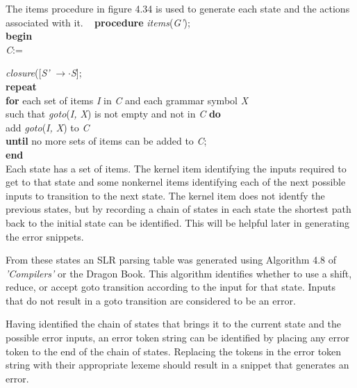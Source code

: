 \documentclass{article}
\begin{document}
The items procedure in figure 4.34 is used to generate each state and the actions associated with it. ~\cite{aho}
\hspace*{1in}\textbf{procedure} \textit{items}(\textit{G'});\\
\hspace*{1in}\textbf{begin}\\
\hspace*{1.25in}\textit{C}:={\textit{closure}({[\textit{S'} $\rightarrow \cdot$\textit{S}]};\\
\hspace*{1.25in}\textbf{repeat}\\
\hspace*{1.5in}\textbf{for} each set of items \textit{I} in \textit{C} and each grammar symbol \textit{X}\\
\hspace*{1.75in}such that \textit{goto}(\textit{I, X}) is not empty and not in \textit{C} \textbf{do}\\
\hspace*{2in}add \textit{goto}(\textit{I, X}) to \textit{C}\\
\hspace*{1.25in}\textbf{until} no more sets of items can be added to \textit{C};\\
\hspace*{1in}\textbf{end}\\

Each state has a set of items.  The kernel item identifying the inputs required to get to that state and some nonkernel items identifying each of the next possible inputs to transition to the next state.  The kernel item does not identfy the previous states, but by recording a chain of states in each state the shortest path back to the initial state can be identified.  This will be helpful later in generating the error snippets.

From these states an SLR parsing table was generated using Algorithm 4.8 of \textit{'Compilers'} or the Dragon Book.  This algorithm identifies whether to use a shift, reduce, or accept goto transition according to the input for that state.  Inputs that do not result in a goto transition are considered to be an error.  

Having identified the chain of states that brings it to the current state and the possible error inputs, an error token string can be identified by placing any error token to the end of the chain of states.  Replacing the tokens in the error token string with their appropriate lexeme should result in a snippet that generates an error.

}
\end{document}
